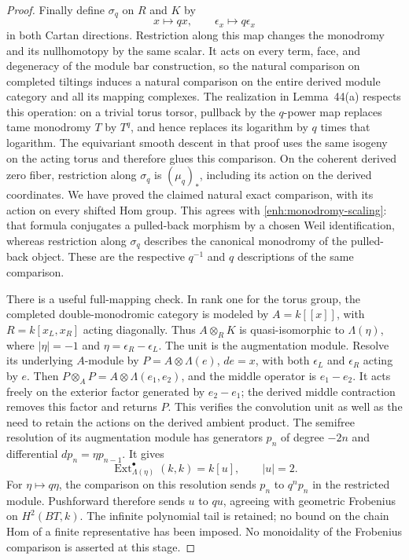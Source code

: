 \documentclass[11pt]{article}
\numberwithin{equation}{section}
\theoremstyle{definition}
\theoremstyle{remark}
\newcommand{\Ext}{\operatorname{Ext}}
\begin{document}
\begin{proof}
Finally define $\sigma_q$ on $R$ and $K$ by
\[
 x\longmapsto qx,\qquad \epsilon_x\longmapsto q\epsilon_x
\]
in both Cartan directions.  Restriction along this map changes the
monodromy and its nullhomotopy by the same scalar.  It acts on every
term, face, and degeneracy of the module bar construction, so the
natural comparison on completed tiltings induces a natural
comparison on the entire derived module category and all its
mapping complexes.  The realization in Lemma~44(a) respects this
operation: on a trivial torus torsor, pullback by the $q$-power map
replaces tame monodromy $T$ by $T^q$, and hence replaces its logarithm
by $q$ times that logarithm.  The equivariant smooth descent in that
proof uses the same isogeny on the acting torus and therefore glues
this comparison.  On the coherent derived zero fiber, restriction
along $\sigma_q$ is $(\mu_q)_*$, including its action on the
derived coordinates.  We have proved the claimed natural exact
comparison, with its action on every shifted Hom group.
This agrees with \eqref{enh:monodromy-scaling}: that formula
conjugates a pulled-back morphism by a chosen Weil identification,
whereas restriction along $\sigma_q$ describes the canonical
monodromy of the pulled-back object.  These are the respective
$q^{-1}$ and $q$ descriptions of the same comparison.

There is a useful full-mapping check.  In rank one for the torus
group, the completed double-monodromic category is modeled by
$A=k[[x]]$, with $R=k[x_L,x_R]$ acting diagonally.  Thus
$A\otimes_R K$ is quasi-isomorphic to $\Lambda(\eta)$, where
$|\eta|=-1$ and $\eta=\epsilon_R-\epsilon_L$.
The unit is the augmentation module.  Resolve its underlying
$A$-module by $P=A\otimes\Lambda(e)$, $de=x$, with both
$\epsilon_L$ and $\epsilon_R$ acting by $e$.  Then
$P\otimes_A P=A\otimes\Lambda(e_1,e_2)$, and the middle
operator is $e_1-e_2$.  It acts freely on the exterior factor
generated by $e_2-e_1$; the derived middle contraction removes this
factor and returns $P$.  This verifies the convolution unit as well
as the need to retain the actions on the derived ambient product.
The semifree resolution of its augmentation module has generators
$p_n$ of degree $-2n$ and differential $dp_n=\eta p_{n-1}$.
It gives
\[
 \Ext^\bullet_{\Lambda(\eta)}(k,k)=k[u],\qquad |u|=2.
\]
For $\eta\mapsto q\eta$, the comparison on this resolution sends
$p_n$ to $q^n p_n$ in the restricted module.  Pushforward therefore
sends $u$ to $qu$, agreeing with geometric Frobenius on
$H^2(BT,k)$.  The infinite polynomial tail is retained; no bound on
the chain Hom of a finite representative has been imposed.
No monoidality of the Frobenius comparison is asserted at this stage.
\end{proof}
\end{document}
